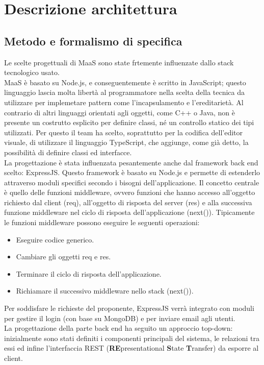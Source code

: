\newpage
\section{Descrizione architettura}
\subsection{Metodo e formalismo di specifica}
Le scelte progettuali di MaaS sono state frtemente influenzate dallo stack tecnologico usato. \\
MaaS è basato su Node.js, e conseguentemente è scritto in JavaScript; questo linguaggio lascia molta libertà al programmatore nella scelta della tecnica da utilizzare per implemetare pattern come l'incapsulamento e l'ereditarietà. Al contrario di altri linguaggi orientati agli oggetti, come C++ o Java, non è presente un costrutto esplicito per definire classi, né un controllo statico dei tipi utilizzati. Per questo il team ha scelto, soprattutto per la codifica dell'editor visuale, di utilizzare il linguaggio TypeScript, che aggiunge, come già detto, la possibilità di definire classi ed interfacce. \\
La progettazione è stata influenzata pesantemente anche dal framework back end scelto: ExpressJS. Questo framework è basato su Node.js e permette di estenderlo attraverso moduli specifici secondo i bisogni dell'applicazione. Il concetto centrale è quello delle funzioni middleware, ovvero funzioni che hanno accesso all'oggetto richiesto dal client (req), all'oggetto di risposta del server (res) e alla successiva funzione middleware nel ciclo di risposta dell'applicazione (next()). Tipicamente le funzioni middleware possono eseguire le seguenti operazioni:
\begin{itemize}
\item Eseguire codice generico.
\item Cambiare gli oggetti req e res.
\item Terminare il ciclo di risposta dell'applicazione.
\item Richiamare il successivo middleware nello stack (next()).
\end{itemize}
Per soddisfare le richieste del proponente, ExpressJS verrà integrato con moduli per gestire il login (con base su MongoDB) e per inviare email agli utenti. \\
La progettazione della parte back end ha seguito un approccio top-down: inizialmente sono stati definiti i componenti principali del sistema, le relazioni tra essi ed infine l'interfaccia REST (\textbf{RE}presentational \textbf{S}tate \textbf{T}ransfer) da esporre al client. \\
